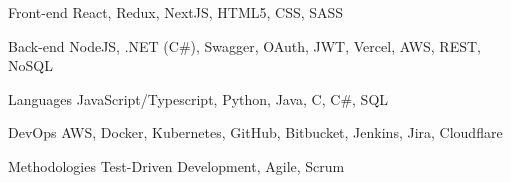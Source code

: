 

\begin{cvskills}
  
  \cvskill
    {Front-end} %
    {React, Redux,  NextJS, HTML5, CSS, SASS} %

  \cvskill
    {Back-end} %
{NodeJS, .NET (C\#), Swagger, OAuth, JWT, Vercel, AWS, REST, NoSQL} %

  \cvskill
    {Languages} %
    {JavaScript/Typescript, Python, Java, C, C\#, SQL} %

  \cvskill
    {DevOps} %
    {AWS, Docker, Kubernetes, GitHub, Bitbucket, Jenkins, Jira, Cloudflare } %

  \cvskill
    {Methodologies} %
    {Test-Driven Development, Agile, Scrum} %

\end{cvskills}
